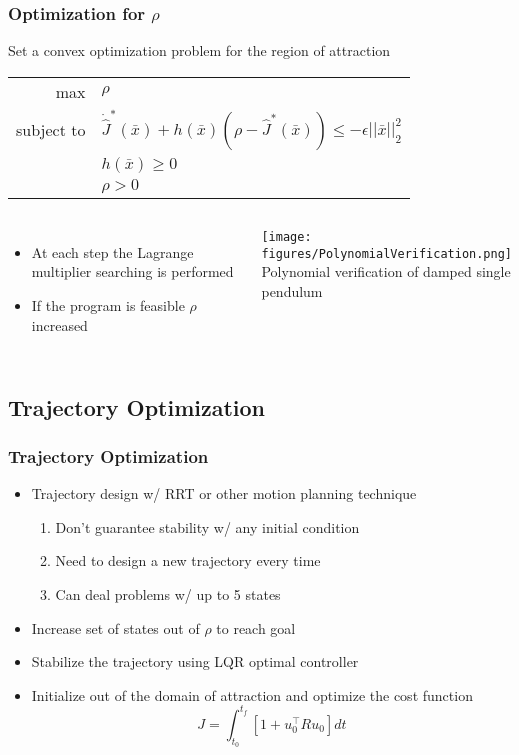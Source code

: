 \documentclass{beamer}
\begin{document}
\begin{frame}
\frametitle{Optimization for $\rho$}
Set a convex optimization problem for the region of attraction 
\begin{center}
\begin{tabular}{ r l }
max & $\rho$ \\
subject to & $\dot{\hat{J}}^{\ast}(\bar{x})+ h(\bar{x})(\rho - \hat{J}^{\ast}(\bar{x}))\leq -\epsilon ||\bar{x}||_2^2$\\
 & $h(\bar{x})\geq 0$\\
 & $\rho>0$
\end{tabular}
\end{center}
\begin{columns}[c] 
\begin{itemize}
\item At each step the Lagrange multiplier searching is performed
\item If the program is feasible $\rho$ increased 
\end{itemize}

\centering
 \texttt{[image: figures/PolynomialVerification.png]}\\
\scriptsize{Polynomial verification of damped single pendulum  \cite{p1}}
\end{columns}

\end{frame}


\subsection{Trajectory Optimization}

\begin{frame}
\frametitle{Trajectory Optimization}
\begin{itemize}
\item Trajectory design w/ RRT or other motion planning technique
\begin{enumerate}
\item Don't guarantee stability w/ any initial condition
\item Need to design a new trajectory every  time
\item Can deal problems w/ up to 5 states \vspace{.2cm}
\end{enumerate}
\item Increase set of states out of $\rho$ to reach goal \vspace{.2cm}
\item Stabilize the trajectory using LQR optimal controller\vspace{.2cm}
\item Initialize out of the domain of attraction and optimize the cost function \vspace{.2cm}
\begin{equation*}
J=\int_{t_0}^{t_f}[1+u_0^{\intercal}Ru_0] dt
\end{equation*}
\end{itemize}

\end{frame}
\end{document}

